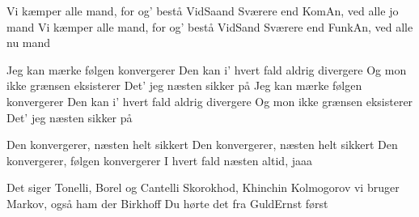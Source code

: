 \documentclass[a4paper,11pt]{article}
\begin{document}
\begin{song}
%
Vi kæmper alle mand, for og' bestå VidSaand
Sværere end KomAn, ved alle jo mand
Vi kæmper alle mand, for og' bestå VidSand
Sværere end FunkAn, ved alle nu mand

%
Jeg kan mærke følgen konvergerer
Den kan i' hvert fald aldrig divergere
Og mon ikke grænsen eksisterer
Det' jeg næsten sikker på
Jeg kan mærke følgen konvergerer
Den kan i' hvert fald aldrig divergere
Og mon ikke grænsen eksisterer
Det' jeg næsten sikker på

%
Den konvergerer, næsten helt sikkert
Den konvergerer, næsten helt sikkert
Den konvergerer, følgen konvergerer
I hvert fald næsten altid, jaaa

%
Det siger Tonelli, Borel og Cantelli
Skorokhod, Khinchin Kolmogorov
vi bruger Markov, også ham der Birkhoff
Du hørte det fra GuldErnst først
\end{song}
\end{document}

